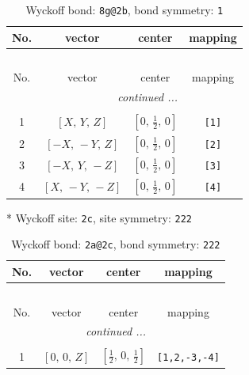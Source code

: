 \documentclass[fleqn,8pt]{jsarticle}
\begin{document}
\begin{longtable}{cccc}
\caption{Wyckoff bond: {\tt 8g@2b}, bond symmetry: {\tt 1}}
 \\
 \hline \hline
No. & vector & center & mapping \\ \hline \endfirsthead

\multicolumn{3}{l}{\tablename\ \thetable{}} \\
 \hline \hline
No. & vector & center & mapping \\ \hline \endhead

 \hline \hline
\multicolumn{3}{r}{\footnotesize\it continued ...} \\ \endfoot

 \hline \hline
\multicolumn{3}{r}{} \\ \endlastfoot

1 & $\left[ X,\, Y,\, Z \right]$ & $\left[ 0,\, \frac{1}{2},\, 0 \right]$ & {\tt [1]} \\ \hline
2 & $\left[ - X,\, - Y,\, Z \right]$ & $\left[ 0,\, \frac{1}{2},\, 0 \right]$ & {\tt [2]} \\ \hline
3 & $\left[ - X,\, Y,\, - Z \right]$ & $\left[ 0,\, \frac{1}{2},\, 0 \right]$ & {\tt [3]} \\ \hline
4 & $\left[ X,\, - Y,\, - Z \right]$ & $\left[ 0,\, \frac{1}{2},\, 0 \right]$ & {\tt [4]} \\
\end{longtable}
* Wyckoff site: {\tt 2c}, site symmetry: {\tt 222}
\renewcommand{\arraystretch}{1.2}
\begin{longtable}{cccc}
\caption{Wyckoff bond: {\tt 2a@2c}, bond symmetry: {\tt 222}}
 \\
 \hline \hline
No. & vector & center & mapping \\ \hline \endfirsthead

\multicolumn{3}{l}{\tablename\ \thetable{}} \\
 \hline \hline
No. & vector & center & mapping \\ \hline \endhead

 \hline \hline
\multicolumn{3}{r}{\footnotesize\it continued ...} \\ \endfoot

 \hline \hline
\multicolumn{3}{r}{} \\ \endlastfoot

1 & $\left[ 0,\, 0,\, Z \right]$ & $\left[ \frac{1}{2},\, 0,\, \frac{1}{2} \right]$ & {\tt [1,2,-3,-4]} \\
\end{longtable}
\renewcommand{\arraystretch}{1.2}
\end{document}
